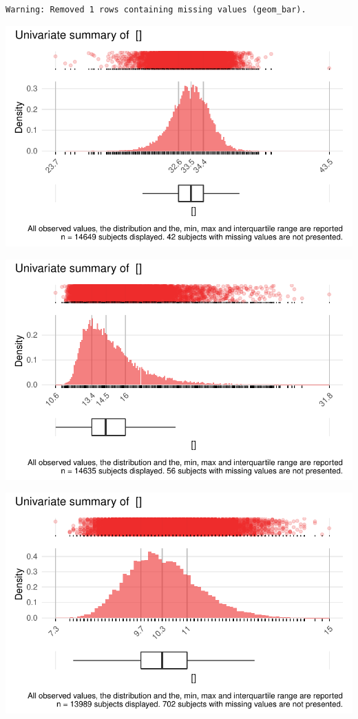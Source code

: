 \documentclass[
  letterpaper,
  DIV=11,
  numbers=noendperiod]{scrreport}
\begin{document}
\begin{verbatim}
Warning: Removed 1 rows containing missing values (geom_bar).
\end{verbatim}

\includegraphics{./Bact_univar_files/figure-pdf/uni04-5.pdf}

\includegraphics{./Bact_univar_files/figure-pdf/uni04-6.pdf}

\includegraphics{./Bact_univar_files/figure-pdf/uni04-7.pdf}
\end{document}
